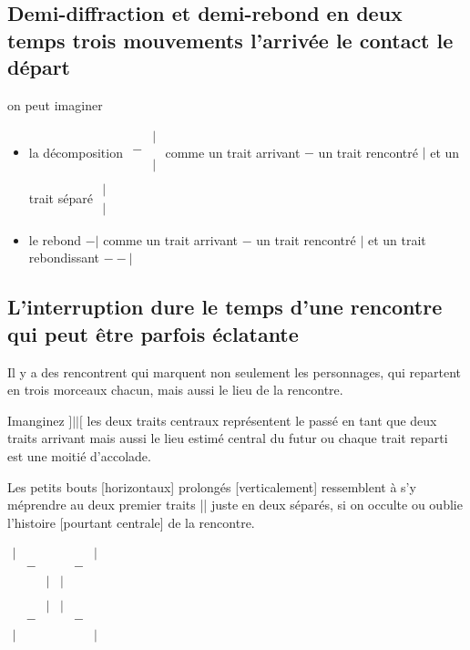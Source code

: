 \documentclass{article}
\newcommand{\bmat}{\scriptscriptstyle\begin{matrix}
& |  \\
 - &  \\
  & |  \\
\end{matrix}}
\begin{document}
\subsection{Demi-diffraction et demi-rebond en deux temps trois mouvements l'arrivée le contact le départ}  
  
  on peut imaginer
  \begin{itemize}
\item     la décomposition
  $\bmat$ comme un trait arrivant $-$ un trait rencontré $|$ et un trait séparé $\begin{matrix} | \\ | \end{matrix}$  
  \item le rebond $- |$  comme un trait arrivant $-$ un trait rencontré $|$ et un trait rebondissant  $- - |$
  \end{itemize}
  
 \subsection{L'interruption dure le temps d'une rencontre qui peut être parfois  éclatante}
 Il y a des rencontrent qui marquent non seulement les personnages, qui repartent en trois morceaux chacun, mais aussi le lieu de la rencontre.
 
  Imanginez $]||[$
 les deux traits centraux représentent le passé en tant que deux traits arrivant mais aussi le lieu estimé central du futur ou chaque trait reparti est une moitié d'accolade. 
 
 Les petits bouts [horizontaux]  prolongés [verticalement] ressemblent à s'y méprendre au deux premier traits  || juste en deux séparés, si on occulte ou oublie l'histoire [pourtant centrale] de la rencontre.
 
  ${\scriptscriptstyle
  \begin{matrix}
  
  |&&\\
  &-&\\
  &&|\\
  &&\\
  &&|\\
   &-&\\
    |&&\\
\end{matrix}
  \begin{matrix}
  &&|\\
  &-&\\
  |&& \\
  &&\\
  |&&\\
   &-&\\
    &&|\\
\end{matrix}}$
 
\end{document}
